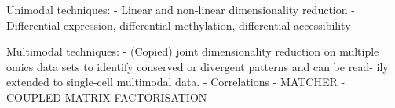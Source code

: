 Unimodal techniques:
- Linear and non-linear dimensionality reduction
- Differential expression, differential methylation, differential accessibility

Multimodal techniques:
- (Copied) joint dimensionality reduction on multiple omics data sets to identify conserved or divergent patterns and can be read- ily extended to single-cell multimodal data. 
- Correlations
- MATCHER
- COUPLED MATRIX FACTORISATION


